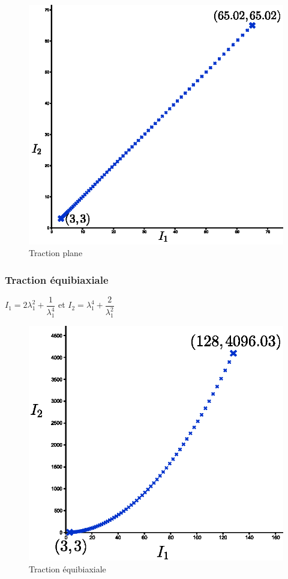 \documentclass[a4paper,11pt]{article}
\begin{document}
\begin{figure}[!ht]
\centering\includegraphics[scale=0.8]{scilab/q2-6-2.eps} 
\caption{Traction plane}
\label{fig:tract_plane}
\end{figure}

\newpage
\subsubsection{Traction équibiaxiale}
$I_1=2\lambda_1^2+\dfrac{1}{\lambda_1^4}$ et $I_2=\lambda_1^4+\dfrac{2}{\lambda_1^2}$
	
\begin{figure}[!ht]
\centering\includegraphics[scale=0.8]{scilab/q2-6-3.eps} 
\caption{Traction équibiaxiale}
\label{fig:tract_equi}
\end{figure}
\end{document}
